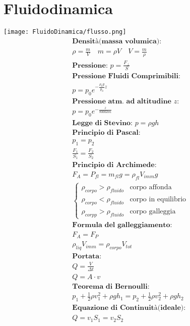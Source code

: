 \section{Fluidodinamica}

\texttt{[image: FluidoDinamica/flusso.png]} \\

\begin{gather*}
    \textbf{Densità(massa volumica): } \\ \rho = \frac{m}{V} \quad m = \rho V \quad V = \frac{m}{\rho} \\
    \textbf{Pressione: } p = \frac{F_\perp}{S} \\
    \textbf{Pressione Fluidi Comprimibili: } \\ p = p_0e^{-\frac{\rho_0 g}{p_0}z} \\
    \textbf{Pressione atm. ad altitudine $z$: } \\
    p = p_0e^{-\frac{z}{8006km}} \\
    \textbf{Legge di Stevino: } p = \rho g h \\
    \textbf{Principio di Pascal: } \\ p_1 = p_2 \\ \frac{F_1}{S_1} = \frac{F_2}{S_2} \\
    \textbf{Principio di Archimede: } \\ F_A = P_{fl} = m_{fl} g = \rho_{fl} V_{imm} g \\ \begin{cases}
        \rho_{corpo} > \rho_{fluido} & \text{corpo affonda}       \\
        \rho_{corpo} < \rho_{fluido} & \text{corpo in equilibrio} \\
        \rho_{corpp} > \rho_{fluido} & \text{corpo galleggia}
    \end{cases} \\
    \textbf{Formula del galleggiamento: } \\ F_A = F_P \\ \rho_{liq} V_{imm} = \rho_{corpo} V_{tot} \\
    \textbf{Portata: } \\ Q = \frac{V}{\Delta t} \\ Q = A \cdot v \\
    \textbf{Teorema di Bernoulli: } \\ p_1 + \frac{1}{2} \rho v_1^2 + \rho g h_1 = p_2 + \frac{1}{2} \rho v_2^2 + \rho g h_2 \\
    \textbf{Equazione di Continuità(ideale): } \\  Q = v_1 S_1 = v_2 S_2 \\

\end{gather*}
